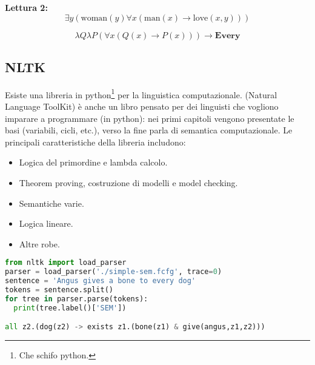 \textbf{Lettura 2:}
\[
\exists y (\text{woman}(y) \forall x (\text{man}(x) \to \text{love}(x, y)))
\]

\[
\boxed{\lambda Q \lambda P (\forall x (Q(x) \to P(x))) \to \textbf{Every}}
\]

\subsection{NLTK}

Esiste una libreria in python\footnote{Che schifo python.} per la linguistica computazionale.  (Natural Language ToolKit) è anche un libro pensato per dei linguisti che vogliono imparare a programmare (in python): nei primi capitoli vengono presentate le basi (variabili, cicli, etc.), verso la fine parla di semantica computazionale. Le principali caratteristiche della libreria includono:

\begin{itemize}
  \item Logica del primordine e lambda calcolo. 
  \item Theorem proving, costruzione di modelli e model checking. 
  \item Semantiche varie. 
  \item Logica lineare. 
  \item Altre robe.
\end{itemize}

\begin{lstlisting}[language=Python, caption=Esempio di semantica inglese utilizzando NLTK.]
from nltk import load_parser
parser = load_parser('./simple-sem.fcfg', trace=0)
sentence = 'Angus gives a bone to every dog'
tokens = sentence.split()
for tree in parser.parse(tokens):
  print(tree.label()['SEM'])

all z2.(dog(z2) -> exists z1.(bone(z1) & give(angus,z1,z2)))
\end{lstlisting}


